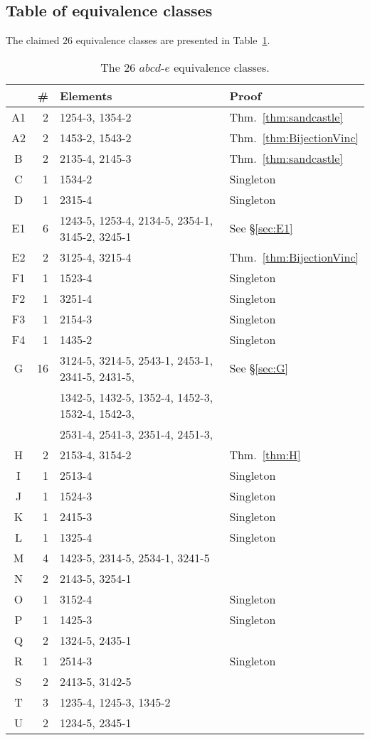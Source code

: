 \documentclass[11pt]{amsart}
\theoremstyle{definition}
\begin{document}
\label{sec:table}

\subsection{Table of equivalence classes}
The claimed $26$ equivalence classes are presented in Table~\ref{tab:classes}.

\begin{table}[ht]
	\small
	\begin{tabular}{|crll|}
		\hline
		& \# & Elements & Proof \\ \hline
		A1 & 2 & 1254-3, 1354-2 & Thm.~\ref{thm:sandcastle} \\
		A2 & 2 & 1453-2, 1543-2 & Thm.~\ref{thm:BijectionVinc} \\
		B & 2 & 2135-4, 2145-3 & Thm.~\ref{thm:sandcastle} \\
		C & 1 & 1534-2 & Singleton \\
		D & 1 & 2315-4 & Singleton \\
		E1 & 6 & 1243-5, 1253-4, 2134-5, 2354-1, 3145-2, 3245-1 & See \S\ref{sec:E1} \\
		E2 & 2 & 3125-4, 3215-4 & Thm.~\ref{thm:BijectionVinc} \\
		F1 & 1 & 1523-4 & Singleton \\
		F2 & 1 & 3251-4 & Singleton \\
		F3 & 1 & 2154-3 & Singleton \\
		F4 & 1 & 1435-2 & Singleton \\
		G & 16 & 3124-5, 3214-5, 2543-1, 2453-1, 2341-5, 2431-5, & See \S\ref{sec:G} \\
		&& 1342-5, 1432-5, 1352-4, 1452-3, 1532-4, 1542-3, & \\
		&& 2531-4, 2541-3, 2351-4, 2451-3, & \\
		H & 2 & 2153-4, 3154-2 & Thm.~\ref{thm:H} \\
		I & 1 & 2513-4 & Singleton \\
		J & 1 & 1524-3 & Singleton \\
		K & 1 & 2415-3 & Singleton \\
		L & 1 & 1325-4 & Singleton \\
		M & 4 & 1423-5, 2314-5, 2534-1, 3241-5 & {\cite{Elizalde2006,Kitaev2005}} \\
		N & 2 & 2143-5, 3254-1 & {\cite{Elizalde2006,Kitaev2005}} \\
		O & 1 & 3152-4 & Singleton \\
		P & 1 & 1425-3 & Singleton \\
		Q & 2 & 1324-5, 2435-1 & {\cite{Elizalde2006,Kitaev2005}} \\
		R & 1 & 2514-3 & Singleton \\
		S & 2 & 2413-5, 3142-5 &  {\cite{Elizalde2006,Kitaev2005}} \\
		T & 3 & 1235-4, 1245-3, 1345-2 & \cite[Thm.~9]{BaxterShattuckMainPaper} \\
		U & 2 & 1234-5, 2345-1 & {\cite{Elizalde2006,Kitaev2005}} \\ \hline
	\end{tabular}
	\medskip
	\caption{The 26 $abcd$-$e$ equivalence classes.}
	\label{tab:classes}
\end{table}
\end{document}
